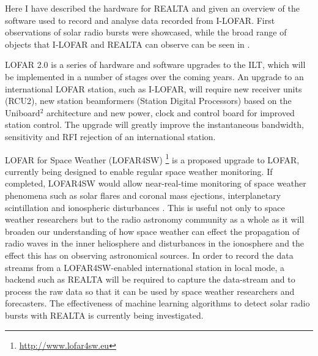 Here I have described the hardware for REALTA and given an overview of the software used to record and analyse data recorded from I-LOFAR. First observations of solar radio bursts were showcased, while the broad range of objects that I-LOFAR and REALTA can observe can be seen in \cite{Murphy2021b}. 

LOFAR 2.0 is a series of hardware and software upgrades to the ILT, which will be implemented in a number of stages over the coming years. An upgrade to an international LOFAR station, such as I-LOFAR, will require new receiver units (RCU2), new station beamformers (Station Digital Processors) based on the Uniboard$^2$ architecture \citep{Schoonderbeek2019} and new power, clock and control board for improved station control. The upgrade will greatly improve the instantaneous bandwidth, sensitivity and RFI rejection of an international station.


LOFAR for Space Weather (LOFAR4SW) \footnote{\hyperref[LOFAR4SW]{http://www.lofar4sw.eu}} is a proposed upgrade to LOFAR, currently being designed to enable regular space weather monitoring. If completed, LOFAR4SW would allow near-real-time monitoring of space weather phenomena such as solar flares and coronal mass ejections, interplanetary scintillation and ionospheric disturbances \citep{Carley2020}. This is useful not only to space weather researchers but to the radio astronomy community as a whole as it will broaden our understanding of how space weather can effect the propagation of radio waves in the inner heliosphere and disturbances in the ionosphere and the effect this has on observing astronomical sources. In order to record the data streams from a LOFAR4SW-enabled international station in local mode, a backend such as REALTA will be required to capture the data-stream and to process the raw data so that it can be used by space weather researchers and forecasters. The effectiveness of machine learning algorithms to detect solar radio bursts with REALTA is currently being investigated.


